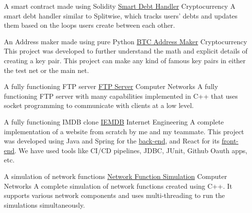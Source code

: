 



\begin{cventries}

  \cventry
    {A smart contract made using Solidity} %
    { \href{https://github.com/kamali-sina/Smart-Debt-Handler}{Smart Debt Handler} } %
    {Cryptocurrency} %
    {} %
    {
       A smart debt handler similar to Splitwise, which tracks users' debts and updates them based on the loops users create between each other.
    }

    \cventry
    {An Address maker made using pure Python} %
    { \href{https://github.com/kamali-sina/BTC-Address-Maker}{BTC Address Maker} } %
    {Cryptocurrency} %
    {} %
    {
      This project was developed to further understand the math and explicit details of creating a key pair. This project can make any kind of famous key pairs in either the test net or the main net.
    }

    \cventry
    {A fully functioning FTP server} %
    { \href{https://github.com/kamali-sina/FTP-server}{FTP Server} } %
    {Computer Networks} %
    {} %
    {
      A fully functioning FTP server with many capabilities implemented in C++ that uses socket programming to communicate with clients at a low level.
    }

    \cventry
    {A fully functioning IMDB clone} %
    { \href{https://github.com/kamali-sina/iemdb}{IEMDB} } %
    {Internet Engineering} %
    {} %
    {
      A complete implementation of a website from scratch by me and my teammate. This project was developed using Java and Spring for the \href{https://github.com/kamali-sina/iemdb}{back-end}, and React for its \href{https://github.com/kamali-sina/iemdb-frontend}{front-end}. We have used tools like CI/CD pipelines, JDBC, JUnit, Github Oauth apps, etc.
    }

    \cventry
    {A simulation of network functions} %
    { \href{https://github.com/kamali-sina/Network-Function-Simulation}{Network Function Simulation} } %
    {Computer Networks} %
    {} %
    {
      A complete simulation of network functions created using C++. It supports various network components and uses multi-threading to run the simulations simultaneously.
    }


\end{cventries}
